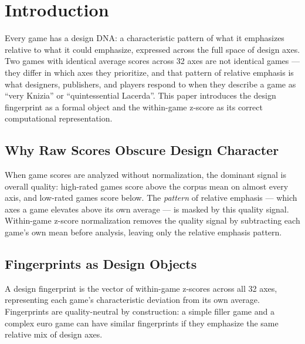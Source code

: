 \section{Introduction}
\label{sec:intro}

Every game has a design DNA: a characteristic pattern of what it emphasizes relative
to what it could emphasize, expressed across the full space of design axes. Two games
with identical average scores across 32 axes are not identical games --- they differ in
which axes they prioritize, and that pattern of relative emphasis is what designers,
publishers, and players respond to when they describe a game as ``very Knizia'' or
``quintessential Lacerda''. This paper introduces the design fingerprint as a formal
object and the within-game z-score as its correct computational representation.

\subsection{Why Raw Scores Obscure Design Character}

When game scores are analyzed without normalization, the dominant signal is overall
quality: high-rated games score above the corpus mean on almost every axis, and
low-rated games score below. The \emph{pattern} of relative emphasis --- which axes
a game elevates above its own average --- is masked by this quality signal.
Within-game z-score normalization removes the quality signal by subtracting each
game's own mean before analysis, leaving only the relative emphasis pattern.

\subsection{Fingerprints as Design Objects}

A design fingerprint is the vector of within-game z-scores across all 32 axes,
representing each game's characteristic deviation from its own average.
Fingerprints are quality-neutral by construction: a simple filler game and a
complex euro game can have similar fingerprints if they emphasize the same
relative mix of design axes.
